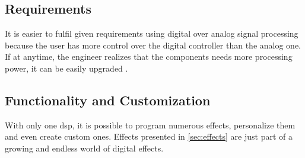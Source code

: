\subsection{Requirements}

It is easier to fulfil given requirements using digital over analog signal processing because the user has more control over the digital controller than the analog one. If at anytime, the engineer realizes that the components needs more processing power, it can be easily upgraded \citep{analog_requirements}.

\subsection{Functionality and Customization}

With only one \gls{dsp}, it is possible to program numerous effects, personalize them and even create custom ones. Effects presented in \autoref{sec:effects} are just part of a growing and endless world of digital effects. 

 